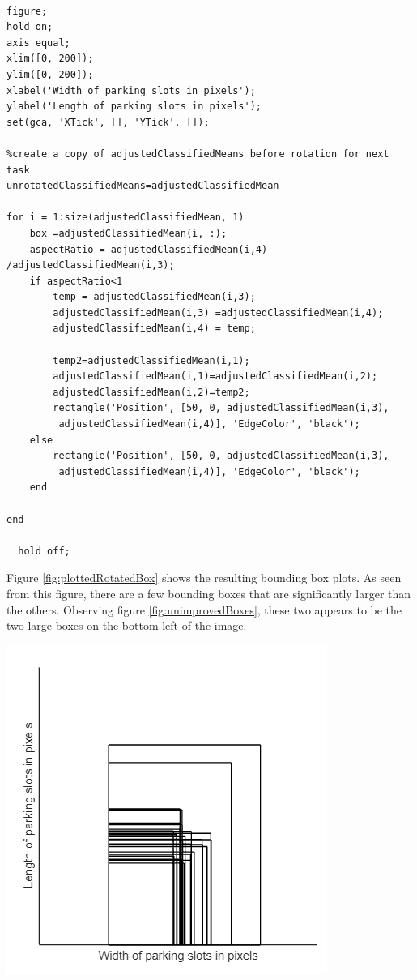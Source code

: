 \documentclass[man]{apa7}
\begin{document}
\begin{lstlisting}[]

figure;
hold on;
axis equal;
xlim([0, 200]);
ylim([0, 200]);
xlabel('Width of parking slots in pixels');
ylabel('Length of parking slots in pixels');
set(gca, 'XTick', [], 'YTick', []);

%create a copy of adjustedClassifiedMeans before rotation for next task
unrotatedClassifiedMeans=adjustedClassifiedMean

for i = 1:size(adjustedClassifiedMean, 1)
    box =adjustedClassifiedMean(i, :);
    aspectRatio = adjustedClassifiedMean(i,4) /adjustedClassifiedMean(i,3);
    if aspectRatio<1
        temp = adjustedClassifiedMean(i,3);
        adjustedClassifiedMean(i,3) =adjustedClassifiedMean(i,4);
        adjustedClassifiedMean(i,4) = temp;
        
        temp2=adjustedClassifiedMean(i,1);
        adjustedClassifiedMean(i,1)=adjustedClassifiedMean(i,2);
        adjustedClassifiedMean(i,2)=temp2;
        rectangle('Position', [50, 0, adjustedClassifiedMean(i,3),
         adjustedClassifiedMean(i,4)], 'EdgeColor', 'black');
    else
        rectangle('Position', [50, 0, adjustedClassifiedMean(i,3),
         adjustedClassifiedMean(i,4)], 'EdgeColor', 'black');
    end
      
end
  
  hold off;
\end{lstlisting}

Figure \ref{fig:plottedRotatedBox} shows the resulting bounding box plots. As seen from this figure, there are a few bounding boxes that are significantly larger than the others. Observing figure \ref{fig:unimprovedBoxes}, these two appears to be the two large boxes on the bottom left of the image. 

\begin{minipage}{\linewidth}
  \includegraphics[]{figures/bboxPlot.png}
  \label{fig:plottedRotatedBox}
\end{minipage}
\end{document}
